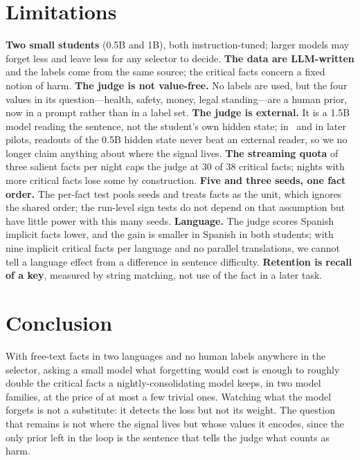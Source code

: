 \documentclass[11pt,a4paper]{article}
\begin{document}
\section{Limitations}
\label{sec:limits}

\textbf{Two small students} (0.5B and 1B), both instruction-tuned; larger models may forget less and leave less for any selector to decide.
\textbf{The data are LLM-written} and the labels come from the same source; the critical facts concern a fixed notion of harm.
\textbf{The judge is not value-free.} No labels are used, but the four values in its question---health, safety, money, legal standing---are a human prior, now in a prompt rather than in a label set.
\textbf{The judge is external.} It is a 1.5B model reading the sentence, not the student's own hidden state; in~\cite{goin2026surprise} and in later pilots, readouts of the 0.5B hidden state never beat an external reader, so we no longer claim anything about where the signal lives.
\textbf{The streaming quota} of three salient facts per night caps the judge at 30 of 38 critical facts; nights with more critical facts lose some by construction.
\textbf{Five and three seeds, one fact order.} The per-fact test pools seeds and treats facts as the unit, which ignores the shared order; the run-level sign tests do not depend on that assumption but have little power with this many seeds.
\textbf{Language.} The judge scores Spanish implicit facts lower, and the gain is smaller in Spanish in both students; with nine implicit critical facts per language and no parallel translations, we cannot tell a language effect from a difference in sentence difficulty.
\textbf{Retention is recall of a key}, measured by string matching, not use of the fact in a later task.

\section{Conclusion}

With free-text facts in two languages and no human labels anywhere in the selector, asking a small model what forgetting would cost is enough to roughly double the critical facts a nightly-consolidating model keeps, in two model families, at the price of at most a few trivial ones.
Watching what the model forgets is not a substitute: it detects the loss but not its weight.
The question that remains is not where the signal lives but whose values it encodes, since the only prior left in the loop is the sentence that tells the judge what counts as harm.
\end{document}

